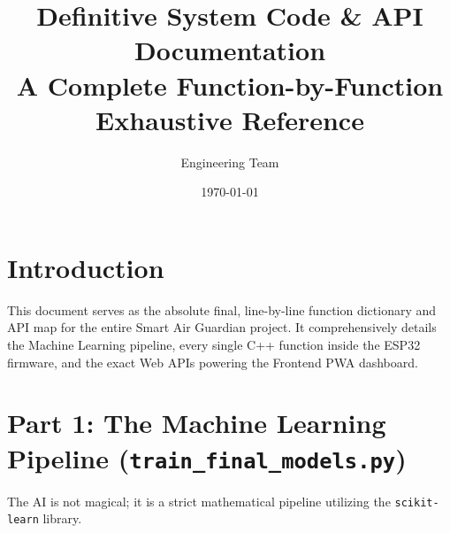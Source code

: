 \documentclass[11pt,a4paper]{article}
\title{\Huge \textbf{Definitive System Code \& API Documentation} \\ \vspace{0.5cm} \Large A Complete Function-by-Function Exhaustive Reference}
\author{Engineering Team}
\date{\today}
\begin{document}
\maketitle
\tableofcontents
\newpage

\section{Introduction}
This document serves as the absolute final, line-by-line function dictionary and API map for the entire Smart Air Guardian project. It comprehensively details the Machine Learning pipeline, every single C++ function inside the ESP32 firmware, and the exact Web APIs powering the Frontend PWA dashboard.

\section{Part 1: The Machine Learning Pipeline (\texttt{train\_final\_models.py})}
The AI is not magical; it is a strict mathematical pipeline utilizing the \texttt{scikit-learn} library.
\end{document}
